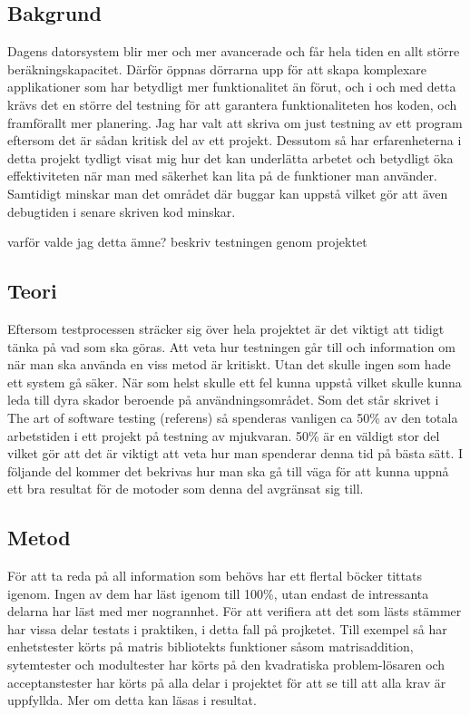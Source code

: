	\subsection{Bakgrund}
	
	Dagens datorsystem blir mer och mer avancerade och får hela tiden en allt större beräkningskapacitet. Därför öppnas dörrarna upp för att skapa komplexare applikationer som har betydligt mer funktionalitet än förut, och i och med detta krävs det en större del testning för att garantera funktionaliteten hos koden, och framförallt mer planering. \newline
	Jag har valt att skriva om just testning av ett program eftersom det är sådan kritisk del av ett projekt. Dessutom så har erfarenheterna i detta projekt tydligt visat mig hur det kan underlätta arbetet och betydligt öka effektiviteten när man med säkerhet kan lita på de funktioner man använder. Samtidigt minskar man det området där buggar kan uppstå vilket gör att även debugtiden i senare skriven kod minskar. \newline
	
	varför valde jag detta ämne?
	beskriv testningen genom projektet
	
	
	\subsection{Teori}
	Eftersom testprocessen sträcker sig över hela projektet är det viktigt att tidigt tänka på vad som ska göras. Att veta hur testningen går till och information om när man ska använda en viss metod är kritiskt. Utan det skulle ingen som hade ett system gå säker. När som helst skulle ett fel kunna uppstå vilket skulle kunna leda till dyra skador beroende på användningsområdet. \newline
	Som det står skrivet i The art of software testing (referens) så spenderas vanligen ca 50\% av den totala arbetstiden i ett projekt på testning av mjukvaran. 50\% är en väldigt stor del vilket gör att det är viktigt att veta hur man spenderar denna tid på bästa sätt. I följande del kommer det bekrivas hur man ska gå till väga för att kunna uppnå ett bra resultat för de motoder som denna del avgränsat sig till.
	
	\subsection{Metod}
	För att ta reda på all information som behövs har ett flertal böcker tittats igenom. Ingen av dem har läst igenom till 100\%, utan endast de intressanta delarna har läst med mer nogrannhet. För att verifiera att det som lästs stämmer har vissa delar testats i praktiken, i detta fall på projketet. Till exempel så har enhetstester körts på matris bibliotekts funktioner såsom matrisaddition, sytemtester och modultester har körts på den kvadratiska problem-lösaren och acceptanstester har körts på alla delar i projektet för att se till att alla krav är uppfyllda. Mer om detta kan läsas i resultat.
	
